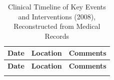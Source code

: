 
\vspace{1em}

\begin{longtable}{
  >{\raggedright\arraybackslash}p{3.0cm}
  >{\raggedright\arraybackslash}p{3.3cm}
  >{\raggedright\arraybackslash}p{9.2cm}
}
\caption{Clinical Timeline of Key Events and Interventions (2008), Reconstructed from Medical Records}
\label{tab:clinical-timeline-2008} \\
\toprule
\textbf{Date} & \textbf{Location} & \textbf{Comments} \\
\midrule
\endfirsthead

\toprule
\textbf{Date} & \textbf{Location} & \textbf{Comments} \\
\midrule
\endhead
\endfoot


\end{longtable}
